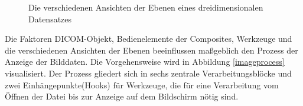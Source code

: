 \begin{figure}[htb]
\centering
{}
\caption{Die verschiedenen Ansichten der Ebenen eines dreidimensionalen Datensatzes}
\label{layers}
\end{figure}
\pagebreak
Die Faktoren DICOM-Objekt, Bedienelemente der Composites, Werkzeuge und die verschiedenen Ansichten der Ebenen beeinflussen maßgeblich den Prozess der Anzeige der Bilddaten. Die Vorgehensweise wird in Abbildung \ref{imageprocess} visualisiert. Der Prozess gliedert sich in sechs zentrale Verarbeitungsblöcke und zwei Einhängepunkte(Hooks) für Werkzeuge, die für eine Verarbeitung vom Öffnen der Datei bis zur Anzeige auf dem Bildschirm nötig sind.

